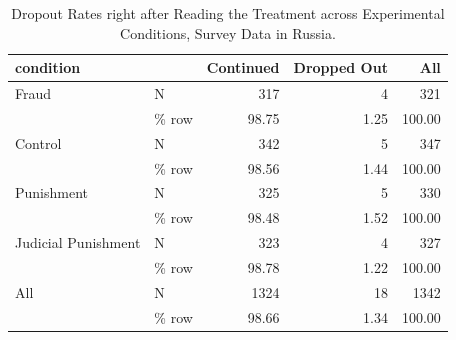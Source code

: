 \documentclass[11pt, ngerman,english,a4]{article}
\begin{document}

\begin{table}[H]
\centering
\caption{Dropout Rates right after Reading the Treatment across Experimental Conditions, Survey Data in Russia.} 
\begin{tabular}[t]{llrrr}
\toprule
condition &   & Continued & Dropped Out & All\\
\midrule
Fraud & N & 317 & 4 & 321\\
 & \% row & 98.75 & 1.25 & 100.00\\
Control & N & 342 & 5 & 347\\
 & \% row & 98.56 & 1.44 & 100.00\\
Punishment & N & 325 & 5 & 330\\
 & \% row & 98.48 & 1.52 & 100.00\\
Judicial Punishment & N & 323 & 4 & 327\\
 & \% row & 98.78 & 1.22 & 100.00\\
All & N & 1324 & 18 & 1342\\
 & \% row & 98.66 & 1.34 & 100.00\\
\bottomrule
\end{tabular}
\end{table}
\end{document}
